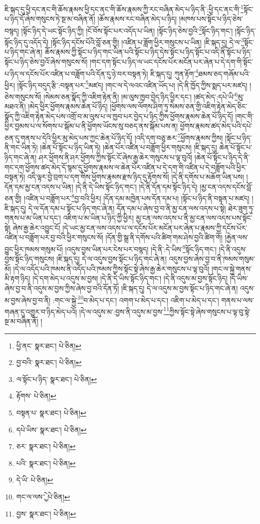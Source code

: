 ཇི་སྐད་དུ་ཕྱི་དང་ནང་གི་ཆོས་རྣམས་ཕྱི་དང་ནང་གི་ཆོས་རྣམས་ཀྱི་རང་བཞིན་མེད་པ་ཉིད་ནི་:ཕྱི་དང་ནང་གི་\footnote{ཕྱི་ནང་  སྣར་ཐང་།  པེ་ཅིན། }སྟོང་པ་ཉིད་དོ་ཞེས་གསུངས་ཏེ་སྔ་མ་བཞིན་ནོ། །ཆོས་རྣམས་རང་བཞིན་མེད་པ་ཉིད། །མཁས་པས་སྟོང་པ་ཉིད་ཅེས་བསྙད། །སྟོང་ཉིད་དེ་ཡང་སྟོང་ཉིད་ཀྱི། །ངོ་བོས་སྟོང་པར་འདོད་པ་ཡིན། །སྟོང་ཉིད་ཅེས་བྱའི་\footnote{བྱ་བའི་  སྣར་ཐང་།  པེ་ཅིན། }སྟོང་ཉིད་གང་། །སྟོང་ཉིད་སྟོང་ཉིད་དུ་འདོད་དེ། །སྟོང་ཉིད་དངོས་པོའི་བློ་ཅན་གྱི། །འཛིན་པ་ཟློག་ཕྱིར་གསུངས་པ་ཡིན། །ཇི་སྐད་དུ། དེ་ལ་\footnote{ལ་སྟོང་པ་ཉིད་  སྣར་ཐང་།  པེ་ཅིན། }སྟོང་པ་ཉིད་གང་ཞེ་ན། ཆོས་རྣམས་ཀྱི་སྟོང་པ་ཉིད་གང་ཡིན་པའི་སྟོང་པ་ཉིད་དེས་སྟོང་པ་ཉིད་སྟོང་པ་འདི་ནི་སྟོང་པ་ཉིད་སྟོང་པ་ཉིད་ཅེས་བྱའོ་ཞེས་གསུངས་སོ། །གང་དག་སྟོང་པ་ཉིད་ལ་ཡང་དངོས་པོར་མངོན་པར་ཞེན་པ་དེ་དག་གི་སྟོང་པ་ཉིད་ལ་དངོས་པོར་འཛིན་པ་བཟློག་པའི་དོན་དུ་ཉེ་བར་བསྟན་ཏེ། ཇི་སྐད་དུ། ཀུན་རྟོག་\footnote{རྟོགས་  པེ་ཅིན། }ཐམས་ཅད་གཞོམ་པའི་ཕྱིར། །སྟོང་ཉིད་བདུད་རྩི་:བསྟན་པར་\footnote{བསྟན་པ་  སྣར་ཐང་།  པེ་ཅིན། }མཛད། །གང་ལ་དེ་ལའང་འཛིན་ཡོད་པ། །དེ་ནི་ཁྱོད་ཀྱིས་སྨད་པར་མཛད། །ཅེས་གསུངས་སོ། །སེམས་ཅན་སྣོད་ཀྱི་འཇིག་རྟེན་ནི། །མ་ལུས་ཁྱབ་བྱེད་ཉིད་ཕྱིར་དང་། །ཚད་མེད་:དཔེ་ཡི་\footnote{དཔེ་ཡིས་  སྣར་ཐང་།  པེ་ཅིན། }མུ་མཐའ་ནི། །མེད་ཕྱིར་ཕྱོགས་རྣམས་ཆེན་པོ་ཉིད། །ཕྱོགས་ལས་ལོགས་ཤིག་ཏུ་སེམས་ཅན་གྱི་འཇིག་རྟེན་མེད་ཅིང་སྣོད་ཀྱི་འཇིག་རྟེན་མེད་པས་འགྲོ་བ་མ་ལུས་པ་ལ་ཁྱབ་པར་བྱེད་པ་ཉིད་ཀྱིས་ཕྱོགས་རྣམས་ཆེན་པོ་ཉིད་དོ། །གང་གི་ཕྱིར་བྱམས་པ་ལ་སོགས་པ་སྒོམ་པ་ནི་ཕྱོགས་ཡོངས་སུ་བཅད་ནས་སྒོམ་པས་ན། ཕྱོགས་རྣམས་ཚད་མེད་པའི་དཔེ་ཅན་དུ་གནས་པ་དེའི་ཕྱིར་མུ་མེད་པས་ཀྱང་ཆེན་པོ་ཉིད་དོ། །འདི་དག་བཅུ་ཆར་\footnote{ཅར་  སྣར་ཐང་།  པེ་ཅིན། }ཕྱོགས་རྣམས་ཀྱིས། །སྟོང་པ་ཉིད་ནི་གང་ཡིན་ཏེ། །ཆེན་པོ་སྟོང་པ་ཉིད་ཡིན་ཏེ། །ཆེན་པོར་འཛིན་པ་བཟློག་ཕྱིར་གསུངས། །ཇི་སྐད་དུ། ཆེན་པོ་སྟོང་པ་ཉིད་གང་ཞེ་ན། ཤར་ཕྱོགས་ནི་ཤར་ཕྱོགས་ཀྱིས་སྟོང་ངོ་ཞེས་རྒྱ་ཆེར་གསུངས་པ་ལྟ་བུའོ། །ཆེན་པོ་སྟོང་པ་ཉིད་དེ་ནི་གང་དག་ཕྱོགས་ཚད་མེད་དོ་སྙམ་དུ་ཕྱོགས་རྣམས་ལ་ཆེན་པོར་འཛིན་པ་དེ་དག་གི་འཛིན་པ་དེ་བཟློག་པའི་ཕྱིར་བསྟན་ཏེ། འདི་ལྟར་བྱེ་བྲག་པ་དག་གིས་ཕྱོགས་རྣམས་རྫས་ཉིད་དུ་རྟོགས་སོ། །དེ་ནི་དགོས་པ་མཆོག་ཡིན་པས། །དོན་དམ་མྱ་ངན་འདས་པ་ཡིན། །དེ་ནི་དེ་ཡིས་སྟོང་ཉིད་གང་། །དེ་ནི་དོན་དམ་སྟོང་ཉིད་དེ། །མྱ་ངན་འདས་དངོས་བློ་ཅན་གྱི། །འཛིན་པ་བཟློག་པར་\footnote{པའི་  སྣར་ཐང་།  པེ་ཅིན། }བྱ་བའི་ཕྱིར། །དོན་དམ་མཁྱེན་པས་དོན་དམ་པ། །སྟོང་པ་ཉིད་ནི་བསྟན་པ་མཛད། །ཇི་སྐད་དུ། དེ་ལ་དོན་དམ་པ་སྟོང་པ་ཉིད་གང་ཞེ་ན། དོན་དམ་པ་ཞེས་བྱ་བ་ནི་མྱ་ངན་ལས་འདས་པ་སྟེ། ཐེར་ཟུག་ཏུ་གནས་པ་མ་ཡིན་པ་དང་། འཇིག་པ་མ་ཡིན་པ་ཉིད་ཀྱི་ཕྱིར། མྱ་ངན་ལས་འདས་པ་ནི་མྱ་ངན་ལས་འདས་པས་སྟོང་སྟེ། ཞེས་རྒྱ་ཆེར་འབྱུང་ངོ། །དེ་ཡང་མྱ་ངན་ལས་འདས་པ་ལ་དངོས་པོར་མངོན་པར་ཞེན་པ་རྣམས་ཀྱི་དངོས་པོར་འཛིན་པ་བཟློག་པར་བྱ་བའི་ཕྱིར་གསུངས་སོ། །དོན་གྱི་སྒྲ་ནི་དགོས་པའི་ཚིག་གམ་ཤེས་བྱའི་ཚིག་གོ། །རྐྱེན་ལས་བྱུང་ཕྱིར་ཁམས་གསུམ་པོ། །འདུས་བྱས་ཡིན་པར་ངེས་པར་བསྙད། །དེ་ནི་:དེ་ཡིས་\footnote{དེ་ཡི་  པེ་ཅིན། }སྟོང་ཉིད་གང་། །དེ་ནི་འདུས་བྱས་སྟོང་ཉིད་གསུངས། །ཇི་སྐད་དུ། དེ་ལ་འདུས་བྱས་སྟོང་པ་ཉིད་གང་ཞེ་ན། འདུས་བྱས་ཞེས་བྱ་བ་ནི་ཁམས་གསུམ་མོ། །དེ་ལ་འདོད་པའི་ཁམས་ནི་འདོད་པའི་ཁམས་ཀྱིས་སྟོང་སྟེ་ཞེས་རྒྱ་ཆེར་གསུངས་པ་ལྟ་བུའོ། །གང་ལ་སྐྱེ་གནས་མི་རྟག་ཉིད། །དེ་དག་མེད་པ་འདུས་མ་བྱས། །དེ་ནི་དེ་ཡིས་སྟོང་ཉིད་གང་། །དེ་ནི་འདུས་མ་བྱས་སྟོང་ཉིད། །དེ་ཡིས་ཞེས་བྱ་བ་ནི་འདུས་མ་བྱས་ཀྱིས་ཞེས་བྱ་བའི་དོན་ཏོ། །ཇི་སྐད་དུ། དེ་ལ་འདུས་མ་བྱས་སྟོང་པ་ཉིད་གང་ཞེ་ན། འདུས་མ་བྱས་ཞེས་བྱ་བ་ནི། :གང་ལ་སྐྱེ་\footnote{གང་ལ་ལས་ྱེ་  པེ་ཅིན། }བ་མེད་པ་དང་། འགག་པ་མེད་པ་དང་། འཇིག་པ་མེད་པ་དང་། གནས་པ་ལས་གཞན་དུ་འགྱུར་བ་ཉིད་མེད་པའོ། །དེ་ལ་འདུས་མ་:བྱས་ནི་འདུས་མ་བྱས་\footnote{བྱས་  སྣར་ཐང་།  པེ་ཅིན། }ཀྱིས་སྟོང་སྟེ་ཞེས་གསུངས་པ་ལྟ་བུ་སྟེ་སྔ་མ་བཞིན་ནོ། །
